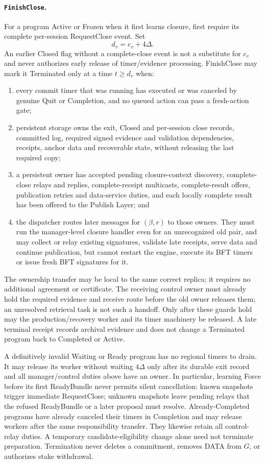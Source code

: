 \documentclass[11pt,a4paper]{article}
\begin{document}
\paragraph{\texttt{FinishClose}.}
For a program Active or Frozen when it first learns closure, first
require its complete per-session RequestClose event. Set
\[
 d_v=c_v+4\Delta.
\]
An earlier Closed flag without a complete-close event is not a substitute
for $c_v$ and never authorizes early release of timer/evidence processing.
FinishClose may mark it Terminated only at a time $t\ge d_v$ when:
\begin{enumerate}[label=(\roman*),itemsep=2pt]
\item every commit timer that was running has executed or was canceled by
genuine Quit or Completion, and no queued action can pass a fresh-action
gate;
\item persistent storage owns the exit, Closed and per-session close records,
committed log, required signed evidence and validation dependencies,
receipts, anchor data and recoverable state, without releasing the last
required copy;
\item a persistent owner has accepted pending closure-context discovery,
complete-close relays and replies, complete-receipt multicasts,
complete-result offers, publication retries and data-service duties, and each locally complete result has been offered to the
Publish Layer; and
\item the dispatcher routes later messages for $(\beta,r)$ to those
owners. They must run the manager-level closure handler even for an
unrecognized old pair, and may collect or relay existing signatures,
validate late receipts, serve data and continue publication, but cannot restart the
engine, execute its BFT timers or issue fresh BFT signatures for it.
\end{enumerate}
The ownership transfer may be local to the same correct replica; it
requires no additional agreement or certificate. The receiving control
owner must already hold the required evidence and receive route before
the old owner releases them; an unresolved retrieval task is not such
a handoff. Only after these
guards hold may the production/recovery worker and its timer machinery
be released. A late terminal receipt records archival evidence and does
not change a Terminated program back to Completed or Active.

A definitively invalid Waiting or Ready program has no regional timers
to drain. It may release its worker without waiting $4\Delta$ only after
its durable exit record and all manager/control duties above have an
owner. In particular, learning Force before its first ReadyBundle never
permits silent cancellation: known snapshots trigger immediate
RequestClose; unknown snapshots leave pending relays that the refused
ReadyBundle or a later proposal must resolve. Already-Completed programs
have already canceled their timers in Completion and may release workers
after the same responsibility transfer. They likewise retain all
control-relay duties. A temporary candidate-eligibility change alone
need not terminate preparation. Termination never deletes a commitment,
removes DATA from $G$, or authorizes stake withdrawal.
\end{document}

